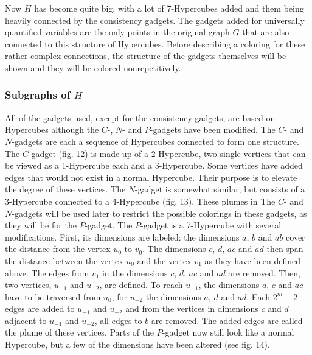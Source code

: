 \documentclass[12pt,a4paper]{article}
\begin{document}
\newline
Now $H$ has become quite big, with a lot of 7-Hypercubes added and them being heavily connected by the consistency gadgets. The gadgets added for universally quantified variables are the only points in the original graph $G$ that are also connected to this structure of Hypercubes. Before describing a coloring for these rather complex connections, the structure of the gadgets themselves will be shown and they will be colored nonrepetitively. 
  
\subsubsection{Subgraphs of $H$}

All of the gadgets used, except for the consistency gadgets, are based on Hypercubes although the $C$-, $N$- and $P$-gadgets have been modified. The $C$- and $N$-gadgets are each a sequence of Hypercubes connected to form one structure. The $C$-gadget (fig. 12) is made up of a 2-Hypercube, two single vertices that can be viewed as a 1-Hypercube each and a 3-Hypercube.
\newline
Some vertices have added edges that would not exist in a normal Hypercube. Their purpose is to elevate the degree of these vertices. The $N$-gadget is somewhat similar, but consists of a 3-Hypercube connected to a 4-Hypercube (fig. 13). These plumes in The $C$- and $N$-gadgets will be used later to restrict the possible colorings in these gadgets, as they will be for the $P$-gadget.
\newline
The $P$-gadget is a 7-Hypercube with several modifications. First, its dimensions are labeled: the dimensions $a$, $b$ and $ab$ cover the distance from the vertex $u_0$ to $v_0$. The dimensions $c$, $d$, $ac$ and $ad$ then span the distance between the vertex $u_0$ and the vertex $v_1$ as they have been defined above. The edges from $v_1$ in the dimensions $c$, $d$, $ac$ and $ad$ are removed. Then, two vertices, $u_{-1}$ and $u_{-2}$, are defined. To reach $u_{-1}$, the dimensions $a$, $c$ and $ac$ have to be traversed from $u_0$, for $u_{-2}$ the dimensions $a$, $d$ and $ad$. Each $2^m-2$ edges are added to $u_{-1}$ and $u_{-2}$ and from the vertices in dimensions $c$ and $d$ adjacent to $u_{-1}$ and $u_{-2}$, all edges to $b$ are removed. The added edges are called the plume of these vertices. Parts of the $P$-gadget now still look like a normal Hypercube, but a few of the dimensions have been altered (see fig. 14).
\end{document}
